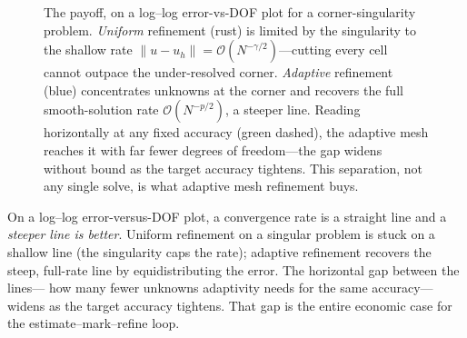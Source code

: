 \begin{figure}[t]
\centering
{}
\caption[Adaptive versus uniform convergence]{The payoff, on a log--log error-vs-DOF
plot for a corner-singularity problem. \emph{Uniform} refinement (rust) is limited by
the singularity to the shallow rate $\|u-u_h\| = \mathcal{O}(N^{-\gamma/2})$---cutting
every cell cannot outpace the under-resolved corner. \emph{Adaptive} refinement (blue)
concentrates unknowns at the corner and recovers the full smooth-solution rate
$\mathcal{O}(N^{-p/2})$, a steeper line. Reading horizontally at any fixed accuracy
(green dashed), the adaptive mesh reaches it with far fewer degrees of freedom---the
gap widens without bound as the target accuracy tightens. This separation, not any
single solve, is what adaptive mesh refinement buys.}
\label{fig:convergence}
\end{figure}

\begin{keyidea}
On a log--log error-versus-DOF plot, a convergence rate is a straight line and a
\emph{steeper line is better}. Uniform refinement on a singular problem is stuck on a
shallow line (the singularity caps the rate); adaptive refinement recovers the steep,
full-rate line by equidistributing the error. The horizontal gap between the lines---
how many fewer unknowns adaptivity needs for the same accuracy---widens as the target
accuracy tightens. That gap is the entire economic case for the
estimate--mark--refine loop.
\end{keyidea}

